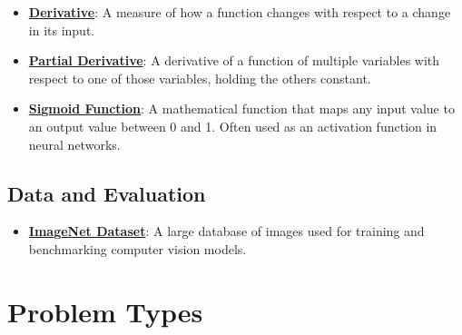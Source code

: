 \documentclass{article}%
\begin{document}
\begin{itemize}[leftmargin=*]
\item \href{https://purdue.brightspace.com/d2l/common/assets/pdfjs-d2l-dist/1.0.14-legacy/web/viewer.html?file=\%2Fcontent\%2Fenforced\%2F1095467-wl.202510.CS.24300.001\%2F04L1-Linear Algebra Primer.pdf\%3Fou\%3D1095467\&lang=en-us\&container=d2l-fileviewer-rendered-pdf\&fullscreen=d2l-fileviewer-rendered-pdf-dialog\&height=667#page=21}{\textbf{Derivative}}: A measure of how a function changes with respect to a change in its input.%
\item \href{https://purdue.brightspace.com/d2l/common/assets/pdfjs-d2l-dist/1.0.14-legacy/web/viewer.html?file=\%2Fcontent\%2Fenforced\%2F1095467-wl.202510.CS.24300.001\%2F04L1-Linear Algebra Primer.pdf\%3Fou\%3D1095467\&lang=en-us\&container=d2l-fileviewer-rendered-pdf\&fullscreen=d2l-fileviewer-rendered-pdf-dialog\&height=667#page=19}{\textbf{Partial Derivative}}: A derivative of a function of multiple variables with respect to one of those variables, holding the others constant.%
\item \href{https://purdue.brightspace.com/d2l/common/assets/pdfjs-d2l-dist/1.0.14-legacy/web/viewer.html?file=\%2Fcontent\%2Fenforced\%2F1095467-wl.202510.CS.24300.001\%2F04L1-Linear Algebra Primer.pdf\%3Fou\%3D1095467\&lang=en-us\&container=d2l-fileviewer-rendered-pdf\&fullscreen=d2l-fileviewer-rendered-pdf-dialog\&height=667#page=21}{\textbf{Sigmoid Function}}: A mathematical function that maps any input value to an output value between 0 and 1. Often used as an activation function in neural networks.%
\end{itemize}

%
\subsection{Data and Evaluation}%
\label{subsec:DataandEvaluation}%
\begin{itemize}[leftmargin=*]%
\item \href{https://purdue.brightspace.com/d2l/common/assets/pdfjs-d2l-dist/1.0.14-legacy/web/viewer.html?file=\%2Fcontent\%2Fenforced\%2F1095467-wl.202510.CS.24300.001\%2F02L2-Intro.pdf\%3Fou\%3D1095467\&lang=en-us\&container=d2l-fileviewer-rendered-pdf\&fullscreen=d2l-fileviewer-rendered-pdf-dialog\&height=667#page=18}{\textbf{ImageNet Dataset}}: A large database of images used for training and benchmarking computer vision models.%
\end{itemize}

%
\section{Problem Types}%
\label{sec:ProblemTypes}%
\end{document}
